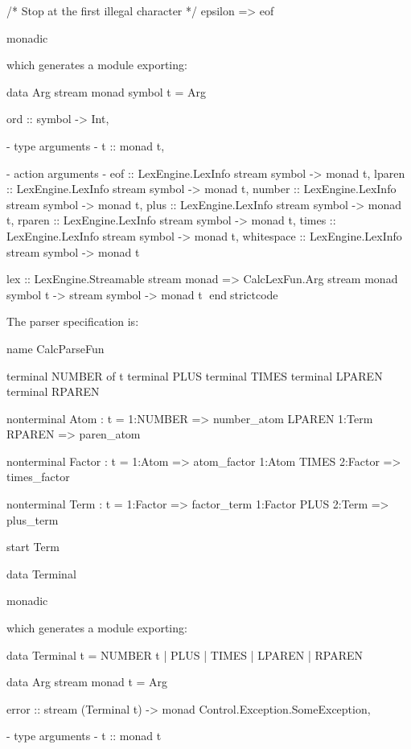\documentclass[10pt]{article}
\begin{document}
\begin{strictcode}
\begin{strictcode}
\begin{strictcode}
\begin{strictcode}
\begin{strictcode}
\begin{strictcode}
\begin{strictcode}
\begin{strictcode}
\begin{strictcode}
\begin{bigstrictcode}
\begin{code}
  /* Stop at the first illegal character */
  epsilon => eof

monadic
\end{code}

\noindent
which generates a module exporting:

\begin{strictcode}
data Arg stream monad symbol t =
   Arg { ord :: symbol -> Int,

         {- type arguments -}
         t :: monad t,

         {- action arguments -}
         eof :: LexEngine.LexInfo stream symbol -> monad t,
         lparen :: LexEngine.LexInfo stream symbol -> monad t,
         number :: LexEngine.LexInfo stream symbol -> monad t,
         plus :: LexEngine.LexInfo stream symbol -> monad t,
         rparen :: LexEngine.LexInfo stream symbol -> monad t,
         times :: LexEngine.LexInfo stream symbol -> monad t,
         whitespace :: LexEngine.LexInfo stream symbol -> monad t }

lex :: LexEngine.Streamable stream monad
       => CalcLexFun.Arg stream monad symbol t -> stream symbol -> monad t
endstrictcode

The parser specification is:

\begin{code}
name CalcParseFun

terminal NUMBER of t
terminal PLUS
terminal TIMES
terminal LPAREN
terminal RPAREN

nonterminal Atom : t =
  1:NUMBER => number_atom
  LPAREN 1:Term RPAREN => paren_atom

nonterminal Factor : t =
  1:Atom => atom_factor
  1:Atom TIMES 2:Factor => times_factor

nonterminal Term : t =
  1:Factor => factor_term
  1:Factor PLUS 2:Term => plus_term

start Term

data Terminal

monadic
\end{code}

\noindent
which generates a module exporting:

\begin{strictcode}
data Terminal t =
   NUMBER t
 | PLUS
 | TIMES
 | LPAREN
 | RPAREN

data Arg stream monad t =
   Arg { error :: stream (Terminal t) -> monad Control.Exception.SomeException,

         {- type arguments -}
         t :: monad t

}
\end{strictcode}
\end{strictcode}
\end{bigstrictcode}
\end{strictcode}
\end{strictcode}
\end{strictcode}
\end{strictcode}
\end{strictcode}
\end{strictcode}
\end{strictcode}
\end{strictcode}
\end{strictcode}
\end{document}
